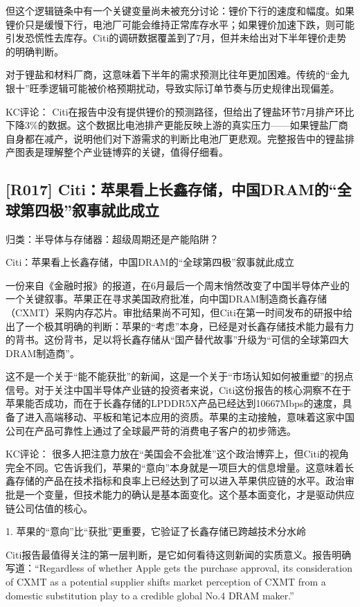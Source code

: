 \documentclass[11pt]{ctexart}
\begin{document}
但这个逻辑链条中有一个关键变量尚未被充分讨论：锂价下行的速度和幅度。如果锂价只是缓慢下行，电池厂可能会维持正常库存水平；如果锂价加速下跌，则可能引发恐慌性去库存。Citi的调研数据覆盖到了7月，但并未给出对下半年锂价走势的明确判断。

对于锂盐和材料厂商，这意味着下半年的需求预测比往年更加困难。传统的“金九银十”旺季逻辑可能被价格预期扰动，导致实际订单节奏与历史规律出现偏差。

KC评论： Citi在报告中没有提供锂价的预测路径，但给出了锂盐环节7月排产环比下降3\%的数据。这个数据比电池排产更能反映上游的真实压力——如果锂盐厂商自身都在减产，说明他们对下游需求的判断比电池厂更悲观。完整报告中的锂盐排产图表是理解整个产业链博弈的关键，值得仔细看。

\subsection{[R017] Citi：苹果看上长鑫存储，中国DRAM的“全球第四极”叙事就此成立}
{\small\color{refgray}归类：半导体与存储器：超级周期还是产能陷阱？}

Citi：苹果看上长鑫存储，中国DRAM的“全球第四极”叙事就此成立

一份来自《金融时报》的报道，在6月最后一个周末悄然改变了中国半导体产业的一个关键叙事。苹果正在寻求美国政府批准，向中国DRAM制造商长鑫存储（CXMT）采购内存芯片。审批结果尚不可知，但Citi在第一时间发布的研报中给出了一个极其明确的判断：苹果的“考虑”本身，已经是对长鑫存储技术能力最有力的背书。这份背书，足以将长鑫存储从“国产替代故事”升级为“可信的全球第四大DRAM制造商”。

这不是一个关于“能不能获批”的新闻，这是一个关于“市场认知如何被重塑”的拐点信号。对于关注中国半导体产业链的投资者来说，Citi这份报告的核心洞察不在于苹果能否成功，而在于长鑫存储的LPDDR5X产品已经达到10667Mbps的速度，具备了进入高端移动、平板和笔记本应用的资质。苹果的主动接触，意味着这家中国公司在产品可靠性上通过了全球最严苛的消费电子客户的初步筛选。

KC评论： 很多人把注意力放在“美国会不会批准”这个政治博弈上，但Citi的视角完全不同。它告诉我们，苹果的“意向”本身就是一项巨大的信息增量。这意味着长鑫存储的产品在技术指标和良率上已经达到了可以进入苹果供应链的水平。政治审批是一个变量，但技术能力的确认是基本面变化。这个基本面变化，才是驱动供应链公司估值的核心。

1. 苹果的“意向”比“获批”更重要，它验证了长鑫存储已跨越技术分水岭

Citi报告最值得关注的第一层判断，是它如何看待这则新闻的实质意义。报告明确写道：“Regardless of whether Apple gets the purchase approval, its consideration of CXMT as a potential supplier shifts market perception of CXMT from a domestic substitution play to a credible global No.4 DRAM maker.”
\end{document}
